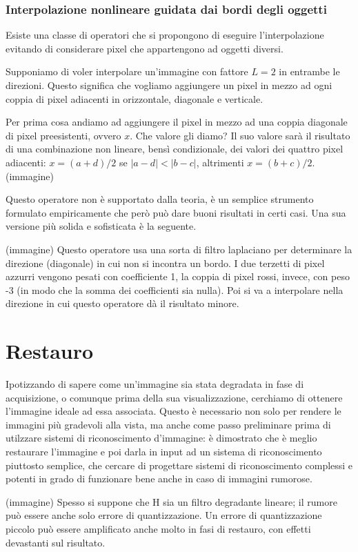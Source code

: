 \documentclass[a4paper,11pt]{article}
\begin{document}
\subsubsection{Interpolazione nonlineare guidata dai bordi degli oggetti}
Esiste una classe di operatori che si propongono di eseguire l'interpolazione evitando di considerare pixel che appartengono ad oggetti diversi.
\par
Supponiamo di voler interpolare un'immagine con fattore $L=2$ in entrambe le direzioni. Questo significa che vogliamo aggiungere un pixel in mezzo ad ogni coppia di pixel
adiacenti in orizzontale, diagonale e verticale.
\par
Per prima cosa andiamo ad aggiungere il pixel in mezzo ad una coppia diagonale di pixel preesistenti, ovvero $x$. Che valore gli diamo? Il suo valore sarà il risultato
di una combinazione non lineare, bensì condizionale, dei valori dei quattro pixel adiacenti: $x = (a+d) / 2$ se $|a - d| < |b - c|$, altrimenti $x = (b + c) / 2$. (immagine)
\par
Questo operatore non è supportato dalla teoria, è un semplice strumento formulato empiricamente che però può dare buoni risultati in certi casi.
Una sua versione più solida e sofisticata è la seguente.
\par
(immagine)
Questo operatore usa una sorta di filtro laplaciano per determinare la direzione (diagonale) in cui non si incontra un bordo. I due terzetti di pixel azzurri vengono
pesati con coefficiente 1, la coppia di pixel rossi, invece, con peso -3 (in modo che la somma dei coefficienti sia nulla). Poi si va a interpolare nella direzione
in cui questo operatore dà il risultato minore.

\newpage

\section{Restauro}
Ipotizzando di sapere come un'immagine sia stata degradata in fase di acquisizione, o comunque prima della sua visualizzazione, cerchiamo di ottenere l'immagine
ideale ad essa associata. Questo è necessario non solo per rendere le immagini più gradevoli alla vista, ma anche come passo preliminare prima di utilzzare
sistemi di riconoscimento d'immagine: è dimostrato che è meglio restaurare l'immagine e poi darla in input ad un sistema di riconoscimento piuttosto semplice,
che cercare di progettare sistemi di riconoscimento complessi e potenti in grado di funzionare bene anche in caso di immagini rumorose.
\par
(immagine)
Spesso si suppone che H sia un filtro degradante lineare; il rumore può essere anche solo errore di quantizzazione. Un errore di quantizzazione piccolo può essere amplificato
anche molto in fasi di restauro, con effetti devastanti sul risultato.
\end{document}
